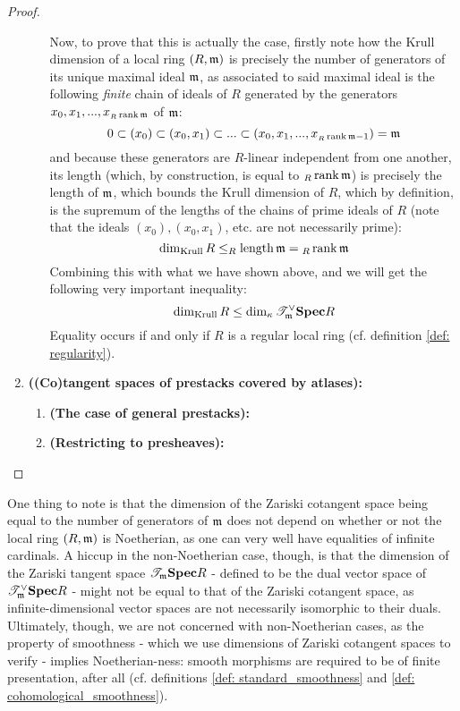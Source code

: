 \begin{proof}
\begin{enumerate}
\begin{enumerate}
                                Now, to prove that this is actually the case, firstly note how the Krull dimension of a local ring $(R, \mathfrak{m})$ is precisely the number of generators of its unique maximal ideal $\mathfrak{m}$, as associated to said maximal ideal is the following \textit{finite} chain of ideals of $R$ generated by the generators $x_0, x_1, ..., x_{{}_R\operatorname{rank} \mathfrak{m}}$ of $\mathfrak{m}$:
                                    $$0 \subset (x_0) \subset (x_0, x_1) \subset ... \subset (x_0, x_1, ..., x_{{}_R\operatorname{rank} \mathfrak{m} - 1}) = \mathfrak{m}$$
                                and because these generators are $R$-linear independent from one another, its length (which, by construction, is equal to ${}_R\operatorname{rank} \mathfrak{m}$) is precisely the length of $\mathfrak{m}$, which bounds the Krull dimension of $R$, which by definition, is the supremum of the lengths of the chains of prime ideals of $R$ (note that the ideals $(x_0), (x_0, x_1)$, etc. are not necessarily prime):
                                    $$\dim_{\mathrm{Krull}} R \leq _R\operatorname{length} \mathfrak{m} = {}_R\operatorname{rank} \mathfrak{m}$$
                                Combining this with what we have shown above, and we will get the following very important inequality:
                                    $$\dim_{\mathrm{Krull}} R \leq \dim_{\kappa} \mathscr{T}^{\vee}_{\mathfrak{m}} \mathbf{Spec} R$$
                                Equality occurs if and only if $R$ is a regular local ring (cf. definition \ref{def: regularity}).
                            \end{enumerate}
                        \item \textbf{\textbf{((Co)tangent spaces of prestacks covered by atlases):}} 
                            \begin{enumerate}
                                \item \textbf{(The case of general prestacks):}
                                \item \textbf{(Restricting to presheaves):}
                            \end{enumerate}
                    \end{enumerate}
                \end{proof}
            \begin{remark}
                One thing to note is that the dimension of the Zariski cotangent space being equal to the number of generators of $\mathfrak{m}$ does not depend on whether or not the local ring $(R, \mathfrak{m})$ is Noetherian, as one can very well have equalities of infinite cardinals. A hiccup in the non-Noetherian case, though, is that the dimension of the Zariski tangent space $\mathscr{T}_{\mathfrak{m}}\mathbf{Spec} R$ - defined to be the dual vector space of $\mathscr{T}^{\vee}_{\mathfrak{m}}\mathbf{Spec} R$ - might not be equal to that of the Zariski cotangent space, as infinite-dimensional vector spaces are not necessarily isomorphic to their duals. Ultimately, though, we are not concerned with non-Noetherian cases, as the property of smoothness - which we use dimensions of Zariski cotangent spaces to verify - implies Noetherian-ness: smooth morphisms are required to be of finite presentation, after all (cf. definitions \ref{def: standard_smoothness} and \ref{def: cohomological_smoothness}).
            \end{remark}
                
